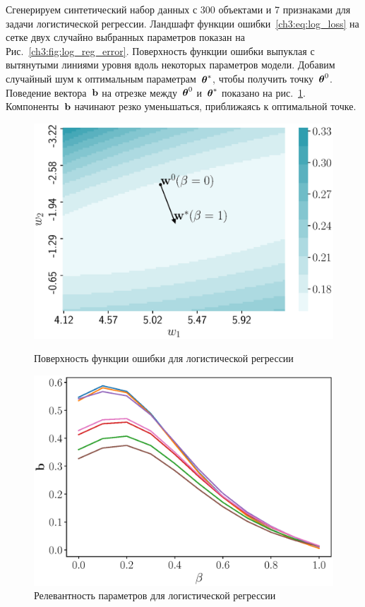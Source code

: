 Сгенерируем синтетический набор данных с 300 объектами и 7 признаками для задачи логистической регрессии. 
Ландшафт функции ошибки~\eqref{ch3:eq:log_loss} на сетке двух случайно выбранных параметров показан на Рис.~\ref{ch3:fig:log_reg_error}.
Поверхность функции ошибки выпуклая с вытянутыми линиями уровня вдоль некоторых параметров модели.
Добавим случайный шум к оптимальным параметрам~$\boldsymbol{\theta}^*$, чтобы получить точку~$\boldsymbol{\theta}^0$. Поведение вектора~$\mathbf{b}$ на отрезке между~$\boldsymbol{\theta}^0$ и~$\boldsymbol{\theta}^*$ показано на рис.~\ref{ch3:fig:log_reg_b_wrt_beta}.
Компоненты~$\mathbf{b}$ начинают резко уменьшаться, приближаясь к оптимальной точке.
\begin{figure}
	\centering
	\begin{minipage}{.47\textwidth}
		\centering
		\includegraphics[width=\linewidth]{figs/ch3/log_reg_error}
		\caption{Поверхность функции ошибки для логистической регрессии}
		\label{ch3:fig:log_reg_error}
	\end{minipage}%
	\begin{minipage}{.47\textwidth}
		\centering
		\includegraphics[width=\linewidth]{figs/ch3/log_reg_b_wrt_beta}
		\caption{Релевантность параметров для логистической регрессии}
		\label{ch3:fig:log_reg_b_wrt_beta}
	\end{minipage}
\end{figure}

